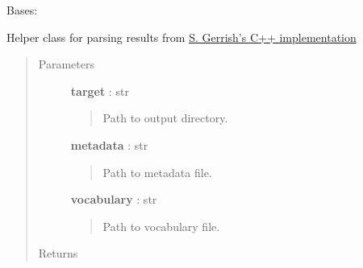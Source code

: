 \documentclass[letterpaper,10pt,english]{sphinxmanual}
\begin{document}

\begin{fulllineitems}
\label{tethne.model.corpus.dtmmodel:tethne.model.corpus.dtmmodel.GerrishLoader}
Bases: 

Helper class for parsing results from \href{http://code.google.com/p/princeton-statistical-learning/downloads/detail?name=dtm\_release-0.8.tgz}{S. Gerrish's C++ implementation}
\begin{quote}\begin{description}
\item[{Parameters}] \leavevmode
\textbf{target} : str
\begin{quote}

Path to  output directory.
\end{quote}

\textbf{metadata} : str
\begin{quote}

Path to metadata file.
\end{quote}

\textbf{vocabulary} : str
\begin{quote}

Path to vocabulary file.
\end{quote}

\item[{Returns}] \leavevmode
{\hyperref[tethne.model.corpus.dtmmodel:tethne.model.corpus.dtmmodel.DTMModel]{}}

\end{description}\end{quote}

\begin{fulllineitems}
\label{tethne.model.corpus.dtmmodel:tethne.model.corpus.dtmmodel.GerrishLoader.load}
\end{fulllineitems}


\end{fulllineitems}

\end{document}
